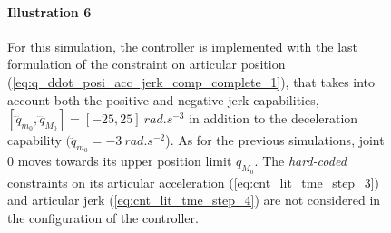 \begin{figure}[!htbp]
\paragraph{Illustration 6}
For this simulation, the controller is implemented with the last  formulation of the constraint on articular position (\ref{eq:q_ddot_posi_acc_jerk_comp_complete_1}), that takes into account both the positive and negative jerk capabilities, $[\dddot{q}_{m_{0}}, \dddot{q}_{M_{0}}] = [-25, 25]~rad.s^{-3}$ in addition to the deceleration capability $(\ddot{q}_{m_{0}} = -3~rad.s^{-2}$). As for the previous simulations, joint $0$ moves towards its upper position limit $q_{M_{0}}$.  The \textit{hard-coded} constraints on its articular acceleration (\ref{eq:cnt_lit_tme_step_3}) and articular jerk (\ref{eq:cnt_lit_tme_step_4}) are not considered in the configuration of the controller. 


\end{figure}
